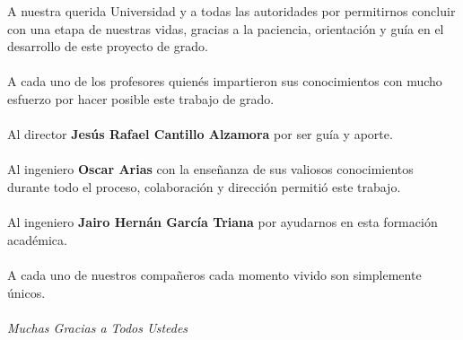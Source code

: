 \acknowledgements

A nuestra querida Universidad y a todas las autoridades por permitirnos concluir con una etapa de nuestras vidas, gracias a la paciencia, orientación y guía en el desarrollo de este proyecto de grado.
\\
\\
A cada uno de los profesores quienés impartieron sus conocimientos con mucho esfuerzo por hacer posible este trabajo de grado.
\\
\\
Al director \textbf{Jesús Rafael Cantillo Alzamora} por ser guía y aporte.
\\
\\
Al ingeniero \textbf{Oscar Arias} con la enseñanza de sus valiosos conocimientos durante todo el proceso, colaboración y dirección permitió este trabajo.
\\
\\
Al ingeniero \textbf{Jairo Hernán García Triana} por ayudarnos en esta formación académica.
\\
\\
A cada uno de nuestros compañeros cada momento vivido son simplemente únicos.
\\
\\
\textit{Muchas Gracias a Todos Ustedes}

